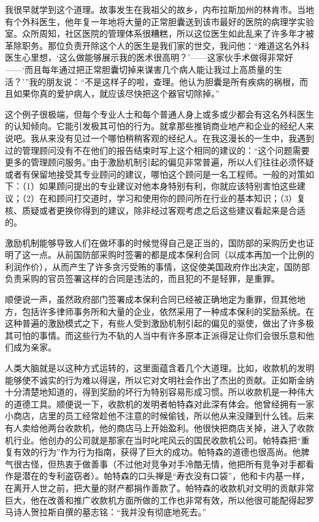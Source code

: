 我很早就学到这个道理。故事发生在我祖父的故乡，内布拉斯加州的林肯市。当地有个外科医生，他年复一年地将大量的正常胆囊送到该市最好的医院的病理学实验室。众所周知，社区医院的管理体系很糟糕，所以这位医生如此乱来了许多年才被革除职务。那位负责开除这个人的医生是我们家的世交，我问他：“难道这名外科医生心里想，‘这么做能够展示我的医术很高明？’——这家伙手术做得非常好——‘而且每年通过把正常胆囊切掉来谋害几个病人能让我过上高质量的生活？’”我的朋友说：“不是这样子的啦，查理。他认为胆囊是所有疾病的祸根，而且如果你真的爱护病人，就应该尽快把这个器官切除掉。”
\par

这个例子很极端，但每个专业人士和每个普通人身上或多或少都会有这名外科医生的认知倾向。它能引发极其可怕的行为。就拿那些推销商业地产和企业的经纪人来说吧。我从来没有见过一个哪怕稍稍客观的经纪人。在我这漫长的一生中，我遇到过的管理顾问没有不在他们的报告结束时写上这个相同的建议的：“这个问题需要更多的管理顾问服务。”由于激励机制引起的偏见非常普遍，所以人们往往必须怀疑或者有保留地接受其专业顾问的建议，哪怕这个顾问是一名工程师。一般的对策如下：（1）如果顾问提出的专业建议对他本身特别有利，你就应该特别害怕这些建议；（2）在和顾问打交道时，学习和使用你的顾问所在行业的基本知识；（3）复核、质疑或者更换你得到的建议，除非经过客观考虑之后这些建议看起来是合适的。
\par

激励机制能够导致人们在做坏事的时候觉得自己是正当的，国防部的采购历史也证明了这一点。从前国防部采购时签署的都是成本保利合同（以成本再加一个比例的利润作价），从而产生了许多贪污受贿的事情，这促使美国政府作出决定，国防部负责采购的官员签署这样的合同是违法的，而且犯的不是轻罪，是重罪。
\par

顺便说一声，虽然政府部门签署成本保利合同已经被正确地定为重罪，但其他地方，包括许多律师事务所和大量的企业，依然采用了一种成本保利的奖励系统。在这种普遍的激励模式之下，有些人受到激励机制引起的偏见的驱使，做出了许多极其可怕的事情。而这些行为不轨的人当中有许多原本正派得足让你们会很乐意和他们成为亲家。
\par

人类大脑就是以这种方式运转的，这里面蕴含着几个大道理。比如，收款机的发明能够使不诚实的行为难以得逞，所以它对文明社会作出了杰出的贡献。正如斯金纳十分清楚地知道的，得到奖励的坏行为特别容易形成习惯。所以收款机是一种伟大的道德工具。顺便说一下，收款机的发明者帕特森对此深有体会。他曾经拥有一家小商店，店里的员工经常趁他不注意的时候偷钱，所以他从来没赚到什么钱。后来有人卖给他两台收款机，他的商店马上开始盈利。他很快把商店关掉，进入了收款机行业。他创办的公司就是那家在当时叱咤风云的国民收款机公司。帕特森把“重复有效的行为”作为行为指南，获得了巨大的成功。帕特森的道德也很高尚。他脾气很古怪，但热衷于做善事（不过他对竞争对手冷酷无情，他把所有竞争对手都看作是潜在的专利盗窃者）。帕特森的口头禅是“寿衣没有口袋”，他和卡内基一样，在离开人世之前，把大量的财产都捐作善款了。帕特森的收款机对文明的贡献非常巨大，他在改善和推广收款机方面所做的工作也非常有效，所以他很可能配得起罗马诗人贺拉斯自撰的墓志铭：“我并没有彻底地死去。”
\par

